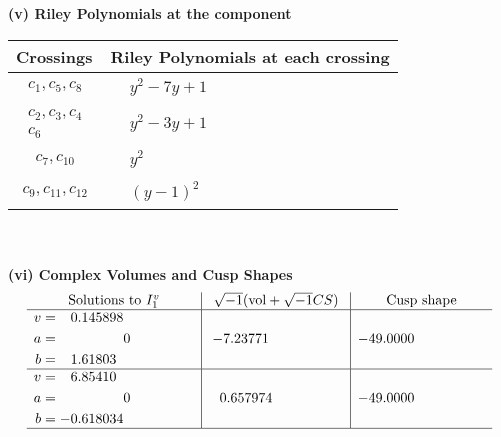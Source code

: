 \documentclass[1p]{elsarticle_modified}
\theoremstyle{definition}
\newcommand{\I}{\sqrt{-1}}
\begin{document}
\newpage\renewcommand{\arraystretch}{1}
\flushleft \textbf{(v) Riley Polynomials at the component}\newline \\
\begin{tabular}{m{50pt}|m{274pt}}
Crossings & \hspace{64pt}Riley Polynomials at each crossing \\
\hline $$\begin{aligned}c_{1},c_{5},c_{8}\end{aligned}$$&$\begin{aligned}
&y^2-7 y+1
\end{aligned}$\\
\hline $$\begin{aligned}c_{2},c_{3},c_{4}\\c_{6}\end{aligned}$$&$\begin{aligned}
&y^2-3 y+1
\end{aligned}$\\
\hline $$\begin{aligned}c_{7},c_{10}\end{aligned}$$&$\begin{aligned}
&y^2
\end{aligned}$\\
\hline $$\begin{aligned}c_{9},c_{11},c_{12}\end{aligned}$$&$\begin{aligned}
&(y-1)^2
\end{aligned}$\\
\hline
\end{tabular}\\~\\
\newpage\flushleft \textbf{(vi) Complex Volumes and Cusp Shapes}
$$\begin{array}{c|c|c}  
\text{Solutions to }I^v_{1}& \I (\text{vol} + \sqrt{-1}CS) & \text{Cusp shape}\\
 \hline 
\begin{aligned}
v &= \phantom{-}0.145898\phantom{ +0.000000I} \\
a &= \phantom{-0.000000 } 0 \\
b &= \phantom{-}1.61803\phantom{ +0.000000I}\end{aligned}
 & -7.23771\phantom{ +0.000000I} & -49.0000\phantom{ +0.000000I} \\ \hline\begin{aligned}
v &= \phantom{-}6.85410\phantom{ +0.000000I} \\
a &= \phantom{-0.000000 } 0 \\
b &= -0.618034\phantom{ +0.000000I}\end{aligned}
 & \phantom{-}0.657974\phantom{ +0.000000I} & -49.0000\phantom{ +0.000000I}\\
 \hline 
 \end{array}$$\newpage
\end{document}
